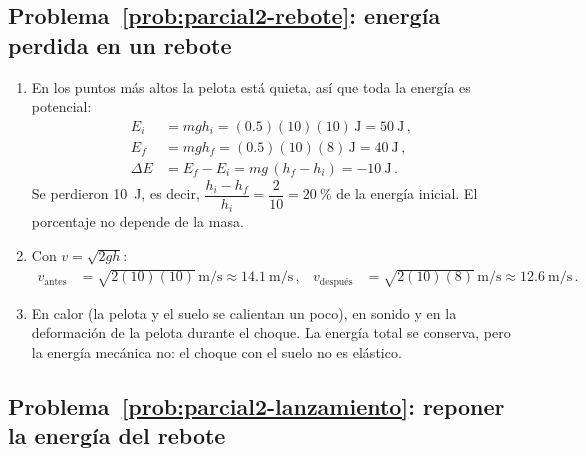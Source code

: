 \documentclass[11pt,a4paper]{book}
\begin{document}
\subsection*{Problema~\ref{prob:parcial2-rebote}: energía perdida en un rebote}
\label{sol:parcial2-rebote}

\begin{enumerate}[label=\alph*)]
    \item En los puntos más altos la pelota está quieta, así que toda la
    energía es potencial:
    \begin{align}
        E_i &= mgh_i = (0.5)(10)(10)\,\si{\joule} = \SI{50}{\joule}\,, \nonumber\\
        E_f &= mgh_f = (0.5)(10)(8)\,\si{\joule} = \SI{40}{\joule}\,, \nonumber\\
        \Delta E &= E_f - E_i = mg\,(h_f - h_i) = \SI{-10}{\joule}\,.
    \end{align}
    Se perdieron \SI{10}{\joule}, es decir,
    $\dfrac{h_i - h_f}{h_i} = \dfrac{2}{10} = \SI{20}{\percent}$ de la
    energía inicial. El porcentaje no depende de la masa.
    \item Con $v = \sqrt{2gh}$:
    \begin{align}
        v_{\text{antes}} &= \sqrt{2(10)(10)}\,\si{\meter\per\second}
            \approx \SI{14.1}{\meter\per\second}\,, &
        v_{\text{después}} &= \sqrt{2(10)(8)}\,\si{\meter\per\second}
            \approx \SI{12.6}{\meter\per\second}\,.
    \end{align}
    \item En calor (la pelota y el suelo se calientan un poco), en sonido y
    en la deformación de la pelota durante el choque. La energía total se
    conserva, pero la energía mecánica no: el choque con el suelo no es
    elástico.
\end{enumerate}

\subsection*{Problema~\ref{prob:parcial2-lanzamiento}: reponer la energía del rebote}
\label{sol:parcial2-lanzamiento}
\end{document}
